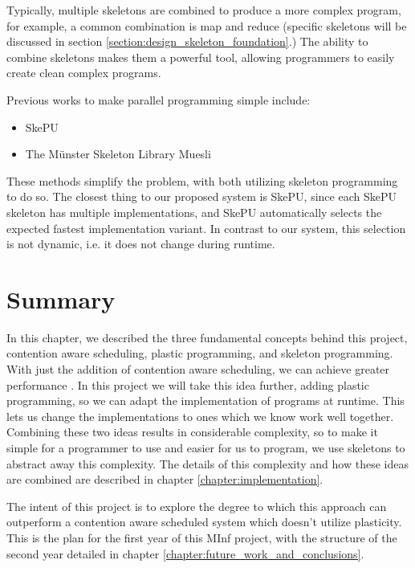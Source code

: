 Typically, multiple skeletons are combined to produce a more complex program, for example, a common combination is map and reduce (specific skeletons will be discussed in section \ref{section:design_skeleton_foundation}.) The ability to combine skeletons makes them a powerful tool, allowing programmers to easily create clean complex programs.

Previous works to make parallel programming simple include:

\begin{itemize}
	\item SkePU \cite{skepu}
	\item The M{\"u}nster Skeleton Library Muesli \cite{muesli}
\end{itemize}

These methods simplify the problem, with both utilizing skeleton programming to do so. The closest thing to our proposed system is SkePU, since each SkePU skeleton has multiple implementations, and SkePU automatically selects the expected fastest implementation variant. In contrast to our system, this selection is not dynamic, i.e. it does not change during runtime. 



\section{Summary}

In this chapter, we described the three fundamental concepts behind this project, contention aware scheduling, plastic programming, and skeleton programming. With just the addition of contention aware scheduling, we can achieve greater performance \cite{lira}. In this project we will take this idea further, adding plastic programming, so we can adapt the implementation of programs at runtime. This lets us change the implementations to ones which we know work well together. Combining these two ideas results in considerable complexity, so to make it simple for a programmer to use and easier for us to program, we use skeletons to abstract away this complexity. The details of this complexity and how these ideas are combined are described in chapter \ref{chapter:implementation}.

The intent of this project is to explore the degree to which this approach can outperform a contention aware scheduled system which doesn't utilize plasticity. This is the plan for the first year of this MInf project, with the structure of the second year detailed in chapter \ref{chapter:future_work_and_conclusions}.